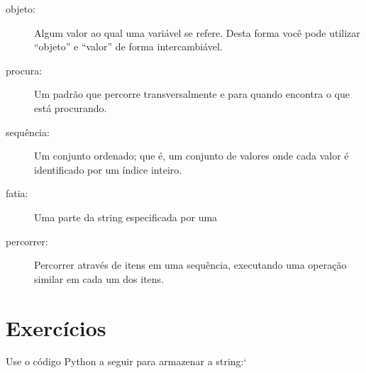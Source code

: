 {\begin{description}

\item[objeto:] Algum valor ao qual uma variável se refere. Desta forma você pode
	utilizar ``objeto'' e ``valor'' de forma intercambiável.

\item[procura:] Um padrão que percorre transversalmente e para quando 
  encontra o que está procurando.

\item[sequência:] Um conjunto ordenado; que é, um conjunto de valores onde
	cada valor é identificado por um índice inteiro.


\item[fatia:] Uma parte da string especificada por uma

\item[percorrer:] Percorrer através de itens em uma sequência, executando uma
	operação similar em cada um dos itens.


\end{description}


\section{Exercícios}
\begin{ex}

Use o código Python a seguir para armazenar a string:`


\end{ex}}
